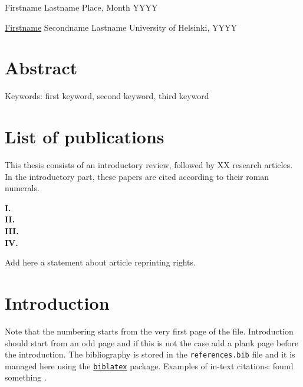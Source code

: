 \documentclass[a4paper,12pt]{article}
\begin{document}
Firstname Lastname\newline
Place, Month YYYY

\newpage

\vspace*{-0.7cm}
\underline{Firstname} Secondname Lastname\newline
University of Helsinki, YYYY\\

\vspace*{-0.7cm}\section*{Abstract}
\lipsum[1-2]

Keywords: first keyword, second keyword, third keyword

\newpage

\setlength{\parskip}{0.5ex plus 0.5ex minus 0.2ex}

\tableofcontents

\setlength{\parskip}{2ex plus 0.5ex minus 0.2ex}

\newpage

\section*{List of publications}

This thesis consists of an introductory review, followed by XX
research articles.  In the introductory part, these papers are cited
according to their roman numerals.

\begin{description}
\item[\bf I.]{}
\item[\bf II.]{}
\item[\bf III.]{}
\item[\bf IV.]{}
\end{description}

Add here a statement about article reprinting rights.

\newpage

\pagestyle{plain}

\section{Introduction}\label{introduction}

Note that the numbering starts from the very first page of the file. Introduction should start from an odd page and if this is not the case add a plank page before the introduction. The bibliography is stored in the \texttt{references.bib} file and it is managed here using the 
\href{https://www.overleaf.com/learn/latex/Bibliography_management_with_biblatex}{\texttt{biblatex}} package. Examples of in-text citations: \cite{paperOne2020} found something \parencite[e.g.][]{paperTwo2021}.
\end{document}

